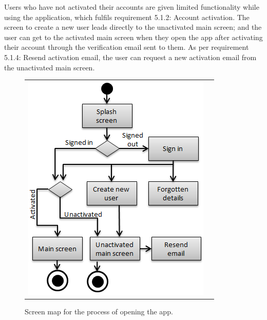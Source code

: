 Users who have not activated their accounts are given limited functionality while using the application, which fulfils requirement 5.1.2: Account activation. The screen to create a new user leads directly to the unactivated main screen; and the user can get to the activated main screen when they open the app after activating their account through the verification email sent to them. As per requirement 5.1.4: Resend activation email, the user can request a new activation email from the unactivated main screen.

\begin{figure}[h!]
\centering
\begin{tabular}{cc}
	\begin{minipage}{0.4\textwidth}
		\includegraphics[width=1\textwidth]{images/opening_app}
		\caption{Screen map for the process of opening the app.}
		\label{opening_app}
	\end{minipage}
	\begin{minipage}{0.5\textwidth}

\end{minipage}
\end{tabular}
\end{figure}
